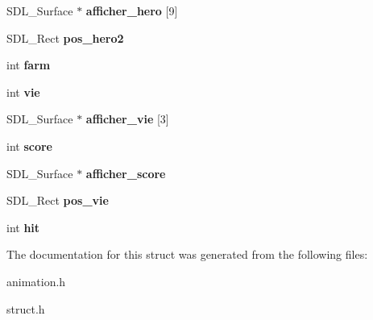 \begin{DoxyCompactItemize}
S\+D\+L\+\_\+\+Surface $\ast$ {\bfseries afficher\+\_\+hero} \mbox{[}9\mbox{]}
\item 
\mbox{\label{structhero_ae21dc2bbecf1ef9b41ca5258ca0c4c9c}} 
S\+D\+L\+\_\+\+Rect {\bfseries pos\+\_\+hero2}
\item 
\mbox{\label{structhero_a864bf6a159fba501fca768cc17c5f7e4}} 
int {\bfseries farm}
\item 
\mbox{\label{structhero_a5887140c26217e8f45870ee09224ff94}} 
int {\bfseries vie}
\item 
\mbox{\label{structhero_a86b652820928a82177c0413233df0e8c}} 
S\+D\+L\+\_\+\+Surface $\ast$ {\bfseries afficher\+\_\+vie} \mbox{[}3\mbox{]}
\item 
\mbox{\label{structhero_ad95606e4c167095066a7d314620d99b5}} 
int {\bfseries score}
\item 
\mbox{\label{structhero_abf045ab06209db5a3a2d5282461a023d}} 
S\+D\+L\+\_\+\+Surface $\ast$ {\bfseries afficher\+\_\+score}
\item 
\mbox{\label{structhero_adbe4f5c90c7c4d99292c65d50dad02b7}} 
S\+D\+L\+\_\+\+Rect {\bfseries pos\+\_\+vie}
\item 
\mbox{\label{structhero_a38a0e660a12c2d6509a6183d05cd135b}} 
int {\bfseries hit}
\end{DoxyCompactItemize}


The documentation for this struct was generated from the following files\+:\begin{DoxyCompactItemize}
\item 
animation.\+h\item 
struct.\+h\end{DoxyCompactItemize}
